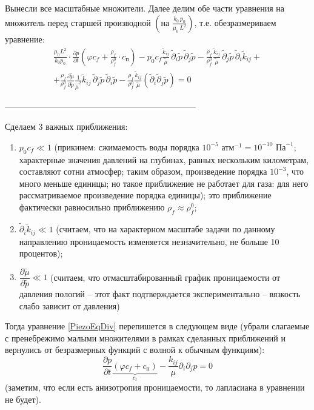 \documentclass[a4paper,12pt]{article}
\newcommand{\beq}{\begin{equation}}
\newcommand{\eeq}{\end{equation}}
\begin{document}
Вынесли все масштабные множители. Далее делим обе части уравнения на множитель перед старшей производной $\left(\text{на }\frac{k_0\,p_0}{\mu_0\,L^2}\right)$, т.е. обезразмериваем уравнение:
\begin{multline}\label{PiezoEqDiv}
\frac{\mu_0L^2}{k_0p_0}\cdot\frac{\partial p}{\partial t}\left(\varphi c_f+\frac{\rho_f}{\rho_f^0}\cdot c_\text{п}\right)-p_0c_f\frac{\tilde{k}_{ij}}{\tilde{\mu}}\,\tilde{\partial}_i\tilde{p}\,\tilde{\partial}_j\tilde{p}-\frac{\rho_f}{\rho_f^0}\frac{\tilde{k}_{ij}}{\tilde{\mu}}\,\tilde{\partial}_j\tilde{p}\,\tilde{\partial}_i\tilde{k}_{ij}+\\+\frac{\rho_f}{\rho_f^0}\frac{\partial\tilde{\mu}}{\partial\tilde{p}}\frac{1}{\tilde{\mu}^2}\tilde{k}_{ij}\,\tilde{\partial}_j\tilde{p}\,\tilde{\partial}_i\tilde{p}-\frac{\rho_f}{\rho_f^0}\frac{\tilde{k}_{ij}}{\tilde{\mu}}\left(\tilde{\partial}_i\tilde{\partial}_j\tilde{p}\right)=0
\end{multline}

--------------------------------------------------------------------

Сделаем 3 важных приближения:
\begin{enumerate}
	\item $p_0 c_f\ll 1$ (прикинем: сжимаемость воды порядка $10^{-5}\text{ атм}^{-1}=10^{-10}\text{ Па}^{-1}$; характерные значения давлений на глубинах, равных нескольким километрам, составляют сотни атмосфер; таким образом, произведение порядка $10^{-3}$, что много меньше единицы; но такое приближение не работает для газа: для него рассматриваемое произведение порядка единицы); это приближение фактически равносильно приближению $\rho_f\approx\rho_f^0$;
	\item $\tilde{\partial}_i\tilde{k}_{ij}\ll 1$ (считаем, что на характерном масштабе задачи по данному направлению проницаемость изменяется незначительно, не больше 10 процентов);
	\item $\dfrac{\partial\tilde{\mu}}{\partial\tilde{p}}\ll 1$ (считаем, что отмасштабированный график проницаемости от давления пологий -- этот факт подтверждается экспериментально -- вязкость слабо зависит от давления)
\end{enumerate}

Тогда уравнение \eqref{PiezoEqDiv} перепишется в следующем виде (убрали слагаемые с пренебрежимо малыми множителями в рамках сделанных приближений и вернулись от безразмерных функций с волной к обычным функциям):
\beq
\frac{\partial p}{\partial t}\underbrace{\left(\varphi c_f+c_\text{п}\right)}_{c_t}-\frac{k_{ij}}{\mu}\partial_i\partial_j p=0
\eeq
(заметим, что если есть анизотропия проницаемости, то лапласиана в уравнении не будет).
\end{document}
